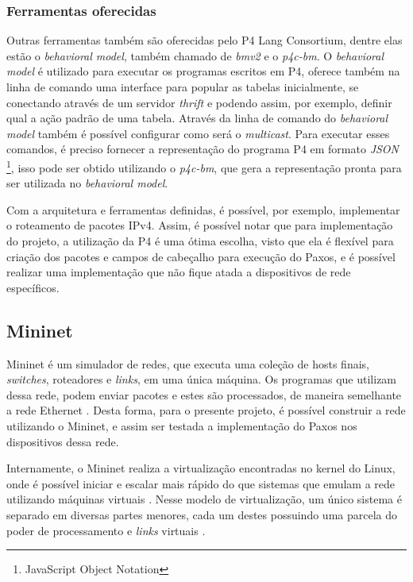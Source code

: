 \documentclass[
    12pt,
    openright, 
    oneside,
    a4paper,
    french,
    english,
    brazil
    ]{facom-ufu-abntex2}
\theoremstyle{definition}
\begin{document}
\subsubsection{Ferramentas oferecidas}
Outras ferramentas também são oferecidas pelo P4 Lang Consortium, dentre elas estão o 
\emph{behavioral model}, também chamado de \emph{bmv2} e o \emph{p4c-bm}. O \emph{behavioral model} é utilizado 
para executar os programas escritos em P4, oferece também na linha de comando uma interface 
para popular as tabelas inicialmente, se conectando através de um servidor \emph{thrift} e podendo 
assim, por exemplo, definir qual a ação padrão de uma tabela. Através da linha de comando do 
\emph{behavioral model} também é possível configurar como será o \emph{multicast}. Para executar esses 
comandos, é preciso fornecer a representação do programa P4 em formato \emph{JSON}
\footnote{JavaScript Object Notation}, isso pode ser obtido utilizando o \emph{p4c-bm}, que gera a 
representação pronta para ser utilizada no \emph{behavioral model}.

Com a arquitetura e ferramentas definidas, é possível, por exemplo, implementar o roteamento 
de pacotes IPv4. Assim, é possível notar que para implementação do projeto, a utilização da P4
é uma ótima escolha, visto que ela é flexível para criação dos pacotes e campos de cabeçalho
para execução do Paxos, e é possível realizar uma implementação que não fique atada a 
dispositivos de rede específicos.

\subsection{Mininet}
Mininet é um simulador de redes, que executa uma coleção de hosts finais, \emph{switches}, 
roteadores e \emph{links}, em uma única máquina. Os programas que utilizam dessa rede, podem enviar
pacotes e estes são processados, de maneira semelhante a rede Ethernet \cite{mininetDocs}.
Desta forma, para o presente projeto, é possível construir a rede utilizando o Mininet, e 
assim ser testada a implementação do Paxos nos dispositivos dessa rede.

Internamente, o Mininet realiza a virtualização encontradas no kernel do Linux, onde é possível
iniciar e escalar mais rápido do que sistemas que emulam a rede utilizando máquinas virtuais
\cite{mininetDocs}. Nesse modelo de virtualização, um único sistema é separado em diversas
partes menores, cada um destes possuindo uma parcela do poder de processamento e \emph{links} virtuais
\cite{mininetDocs}.
\end{document}
